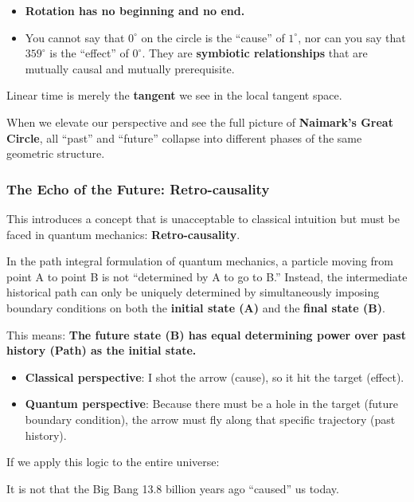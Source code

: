 \begin{itemize}
\item \textbf{Rotation has no beginning and no end.}

\item You cannot say that $0^\circ$ on the circle is the ``cause'' of $1^\circ$, nor can you say that $359^\circ$ is the ``effect'' of $0^\circ$. They are \textbf{symbiotic relationships} that are mutually causal and mutually prerequisite.
\end{itemize}

Linear time is merely the \textbf{tangent} we see in the local tangent space.

When we elevate our perspective and see the full picture of \textbf{Naimark's Great Circle}, all ``past'' and ``future'' collapse into different phases of the same geometric structure.

\subsubsection{The Echo of the Future: Retro-causality}

This introduces a concept that is unacceptable to classical intuition but must be faced in quantum mechanics: \textbf{Retro-causality}.

In the path integral formulation of quantum mechanics, a particle moving from point A to point B is not ``determined by A to go to B.'' Instead, the intermediate historical path can only be uniquely determined by simultaneously imposing boundary conditions on both the \textbf{initial state (A)} and the \textbf{final state (B)}.

This means: \textbf{The future state (B) has equal determining power over past history (Path) as the initial state.}

\begin{itemize}
\item \textbf{Classical perspective}: I shot the arrow (cause), so it hit the target (effect).

\item \textbf{Quantum perspective}: Because there must be a hole in the target (future boundary condition), the arrow must fly along that specific trajectory (past history).
\end{itemize}

If we apply this logic to the entire universe:

It is not that the Big Bang 13.8 billion years ago ``caused'' us today.


